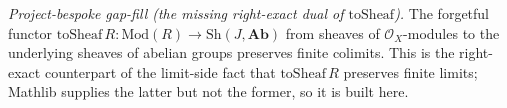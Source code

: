\begin{lemma}
  \label{lem:toSheaf_preservesFiniteColimits}
  \leanok
  \textit{Project-bespoke gap-fill (the missing right-exact dual of \(\mathrm{toSheaf}\)).}
  The forgetful functor \(\mathrm{toSheaf}\,R : \mathrm{Mod}(R) \to \mathrm{Sh}(J, \mathbf{Ab})\)
  from sheaves of \(\mathcal{O}_X\)-modules to the underlying sheaves of abelian groups preserves
  finite colimits. This is the right-exact counterpart of the limit-side fact that
  \(\mathrm{toSheaf}\,R\) preserves finite limits; Mathlib supplies the latter but not the former, so
  it is built here.
\end{lemma}
